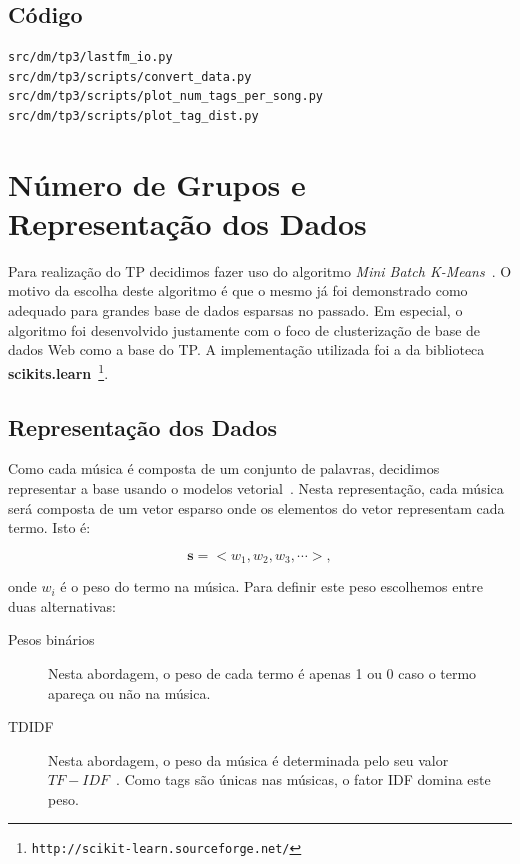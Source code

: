 \documentclass[brazil,a4paper,12pt]{article}
\begin{document}
\subsection{Código}
\begin{verbatim}
src/dm/tp3/lastfm_io.py
src/dm/tp3/scripts/convert_data.py
src/dm/tp3/scripts/plot_num_tags_per_song.py
src/dm/tp3/scripts/plot_tag_dist.py
\end{verbatim}

\section{Número de Grupos e Representação dos Dados}

Para realização do TP decidimos fazer uso do algoritmo 
\emph{Mini Batch K-Means}~\cite{sculley2010web}. O motivo da escolha deste
algoritmo é que o mesmo já foi demonstrado como adequado para grandes base
de dados esparsas no passado. Em especial, o algoritmo foi desenvolvido
justamente com o foco de clusterização de base de dados Web como a 
base do TP. A implementação utilizada foi a da biblioteca 
{\bf scikits.learn}~\footnote{\texttt{http://scikit-learn.sourceforge.net/}}.

\subsection{Representação dos Dados}

Como cada música é composta de um conjunto de palavras, decidimos representar
a base usando o modelos vetorial~\cite{baeza2010modern,meira}. Nesta representação,
cada música será composta de um vetor esparso onde os elementos do vetor representam
cada termo. Isto é:

$$ \mathbf{s} = <{w_1, w_2, w_3, \cdots}>, $$

onde $w_i$ é o peso do termo na música. Para definir este peso escolhemos
entre duas alternativas:

\begin{description}

\item [Pesos binários] Nesta abordagem, o peso de cada termo é apenas 1 ou 0
caso o termo apareça ou não na música.

\item [TDIDF] Nesta abordagem, o peso da música é determinada pelo seu valor
$TF-IDF$~\cite{baeza2010modern}. Como tags são únicas nas músicas, o fator
IDF domina este peso.

\end{description}
\end{document}
